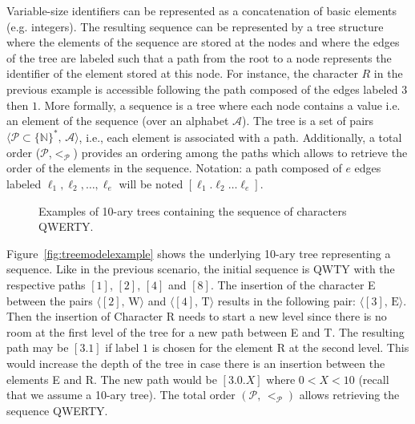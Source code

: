 Variable-size identifiers can be represented as a concatenation of basic
elements (e.g. integers). The resulting sequence can be represented by a tree
structure where the elements of the sequence are stored at the nodes and where
the edges of the tree are labeled such that a path from the root to a node
represents the identifier of the element stored at this node. For instance, the
character $R$ in the previous example is accessible following the path composed
of the edges labeled $3$ then $1$. More formally, a sequence is a tree where
each node contains a value i.e. an element of the sequence (over an alphabet
$\mathcal{A}$). The tree is a set of pairs
$\langle\mathcal{P}\subset\{\mathbb{N}\}^*,\, \mathcal{A} \rangle$, i.e., each
element is associated with a path. Additionally, a total order
($\mathcal{P}$,$<_{\mathcal{P}}$) provides an ordering among the paths which
allows to retrieve the order of the elements in the sequence. Notation: a path
composed of $e$ edges labeled $\ell_1,\ell_2,\ldots,\ell_e$ will be noted
$[\ell_1.\ell_2\ldots\ell_e]$.

\begin{figure*}
  \centering
  \hspace{20pt}
  \caption{Examples of 10-ary trees containing the sequence of characters
    QWERTY.}
\end{figure*}


Figure~\ref{fig:treemodelexample} shows the underlying 10-ary tree representing
a sequence. Like in the previous scenario, the initial sequence is QWTY with
the respective paths $[1]$, $[2]$, $[4]$ and $[8]$. The insertion of the
character E between the pairs $\langle [2],\, \text{W}\rangle$ and
$\langle [4],\, \text{T}\rangle$ results in the following pair:
$\langle [3],\, \text{E} \rangle$. Then the insertion of Character R needs to
start a new level since there is no room at the first level of the tree for a
new path between E and T. The resulting path may be $[3.1]$ if label $1$ is
chosen for the element R at the second level. This would increase the depth of
the tree in case there is an insertion between the elements E and R. The new
path would be $[3.0.X]$ where $0<X<10$ (recall that we assume a 10-ary
tree). The total order $(\mathcal{P},\,<_\mathcal{P})$ allows retrieving the
sequence QWERTY.

